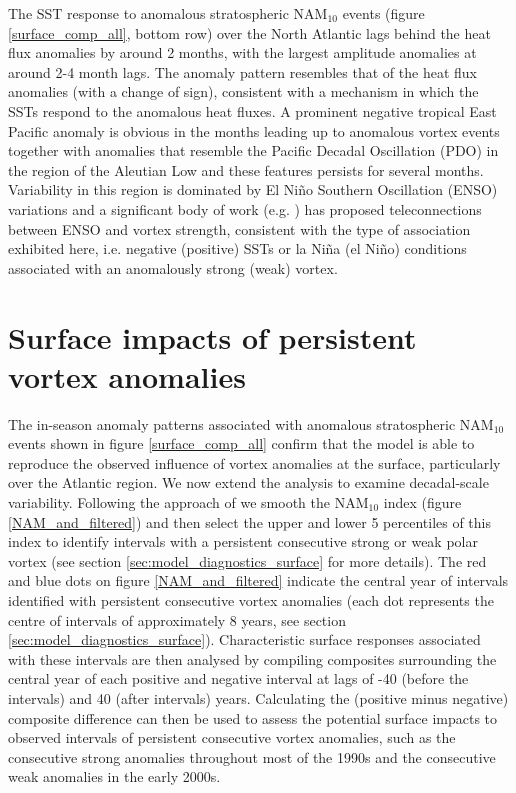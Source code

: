 The SST response to anomalous stratospheric NAM$_{10}$ events (figure \ref{surface_comp_all}, bottom row) over the North Atlantic lags behind the heat flux anomalies by around 2 months, with the largest amplitude anomalies at around 2-4 month lags. The anomaly pattern resembles that of the heat flux anomalies (with a change of sign), consistent with a mechanism in which the SSTs respond to the anomalous heat fluxes. A prominent negative tropical East Pacific anomaly is obvious in the months leading up to anomalous vortex events together with  anomalies that resemble the Pacific Decadal Oscillation (PDO) in the region of the Aleutian Low \citep{mantuaPacific1997} and these features persists for several months. Variability in this region is dominated by El Ni\~{n}o Southern Oscillation (ENSO) variations and a significant body of work (e.g. \cite{domeisenTeleconnection2019a}) has proposed teleconnections between ENSO and vortex strength, consistent with the type of association exhibited here, i.e. negative (positive) SSTs or la Ni\~{n}a (el Ni\~{n}o) conditions associated with an anomalously strong (weak) vortex. 


\section{Surface impacts of persistent vortex anomalies}
\label{persistent}
The in-season anomaly patterns associated with anomalous stratospheric NAM$_{10}$ events shown in figure \ref{surface_comp_all} confirm that the model is able to reproduce the observed influence of vortex anomalies at the surface, particularly over the Atlantic region. We now extend the analysis to examine decadal-scale variability. Following the approach of \cite{reichlerStratospheric2012b} we smooth the NAM$_{10}$ index  (figure \ref{NAM_and_filtered}) and then select the upper and lower 5 percentiles of this index to identify intervals with a persistent consecutive strong or weak polar vortex (see section \ref{sec:model_diagnostics_surface} for more details). The red and blue dots on figure \ref{NAM_and_filtered} indicate the central year of intervals identified with persistent consecutive vortex anomalies (each dot represents the centre of intervals of approximately 8 years, see section \ref{sec:model_diagnostics_surface}). Characteristic surface responses associated with these intervals are then analysed by compiling composites surrounding the central year of each positive and negative interval at lags of -40 (before the intervals) and 40 (after intervals) years. Calculating the (positive minus negative) composite difference can then be used to assess the potential surface impacts to observed intervals of persistent consecutive vortex anomalies, such as the consecutive strong anomalies throughout most of the 1990s and the consecutive weak anomalies in the early 2000s. 
 

